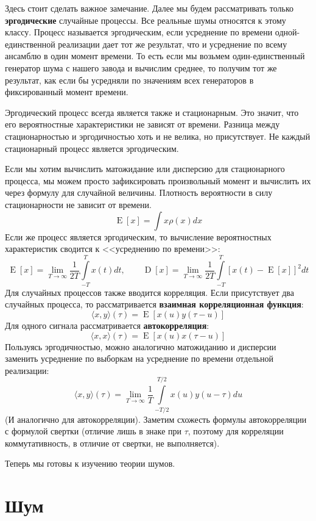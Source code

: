 \documentclass[12pt, a4paper]{article}
\DeclareMathOperator{\E}{E}
\DeclareMathOperator{\D}{D}
\begin{document}
Здесь стоит сделать важное замечание. Далее мы будем рассматривать только \textbf{эргодические} случайные процессы. Все реальные шумы относятся к этому классу. Процесс называется эргодическим, если усреднение по времени одной-единственной реализации дает тот же результат, что и усреднение по всему ансамблю в один момент времени. То есть если мы возьмем один-единственный генератор шума с нашего завода и вычислим среднее, то получим тот же результат, как если бы усредняли по значениям всех генераторов в фиксированный момент времени.

Эргодический процесс всегда является также и стационарным. Это значит, что его вероятностные характеристики не зависят от времени. Разница между стационарностью и эргодичностью хоть и не велика, но присутствует. Не каждый стационарный процесс является эргодическим.

Если мы хотим вычислить матожидание или дисперсию для стационарного процесса, мы можем просто зафиксировать произвольный момент и вычислить их через формулу для случайной величины. Плотность вероятности в силу стационарности не зависит от времени.
\[
\E[x] = \int x \rho(x)dx
\]
Если же процесс является эргодическим, то вычисление вероятностных характеристик сводится к <<усреднению по времени>>:
\[
\E[x] = \lim\limits_{T\rightarrow\infty} \frac{1}{2T}\int\limits_{-T}^{T}x(t)dt, \qquad \D[x] = \lim\limits_{T\rightarrow\infty} \frac{1}{2T}\int\limits_{-T}^{T}[x(t)-\E[x]]^2dt
\]
Для случайных процессов также вводится корреляция. Если присутствует два случайных процесса, то рассматривается \textbf{взаимная корреляционная функция}:
\[
\langle x, y \rangle (\tau) = \E\left[ x(u)y(\tau-u) \right]
\]
Для одного сигнала рассматривается \textbf{автокорреляция}:
\[
\langle x, x \rangle (\tau) = \E\left[ x(u)x(\tau-u) \right]
\]
Пользуясь эргодичностью, можно аналогично матожиданию и дисперсии заменить усреднение по выборкам на усреднение по времени отдельной реализации:
\[
\langle x, y \rangle (\tau) = \lim\limits_{T \rightarrow\infty}\frac{1}{T}\int\limits_{-T/2}^{T/2}x(u)y(u-\tau)du
\]
(И аналогично для автокорреляции). Заметим схожесть формулы автокорреляции с формулой свертки (отличие лишь в знаке при $\tau$, поэтому для корреляции коммутативность, в отличие от свертки, не выполняется).

Теперь мы готовы к изучению теории шумов.

\section*{Шум}
\end{document}
